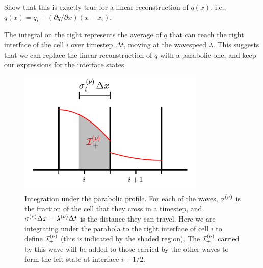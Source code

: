 \begin{exercise}
{Show that this is exactly true for a linear reconstruction of $q(x)$, i.e.,
$q(x) = q_i + (\partial q/\partial x) (x - x_i)$.}
\end{exercise}

\noindent The integral on the right represents the average of $q$ that
can reach the right interface of the cell $i$ over timestep $\Delta
t$, moving at the wavespeed $\lambda$.  This suggests that we can
replace the linear reconstruction of $q$ with a parabolic one, and
keep our expressions for the interface states.

\begin{figure}
\centering
\includegraphics[width=3.5in]{ppm-trace}
\caption[Integration under the parabola profile for to an
  interface]{\label{fig:ppm_trace} Integration under the parabolic
  profile.  For each of the waves, $\sigma^{(\nu)}$ is the fraction of
  the cell that they cross in a timestep, and $\sigma^{(\nu)} \Delta x =
  \lambda^{(\nu)} \Delta t$ is the distance they can travel.  Here we are
  integrating under the parabola to the right interface of cell $i$ to
  define $\mathcal{I}_+^{(\nu)}$ (this is indicated by the shaded
  region).  The $\mathcal{I}_+^{(\nu)}$ carried by this wave will be
  added to those carried by the other waves to form the left state at
  interface $i+1/2$.}
\end{figure}

